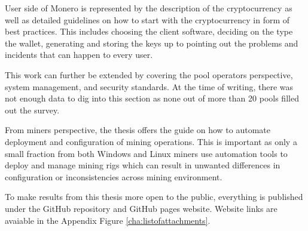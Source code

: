 \documentclass[
  printed, %
  table,   %
  lof,     %
  lot,     %
           oneside, color
]{fithesis3}
\begin{document}
User side of Monero is represented by the description of the cryptocurrency as well as detailed guidelines on how to start with the cryptocurrency in form of best practices. This includes choosing the client software, deciding on the type the wallet, generating and storing the keys up to pointing out the problems and incidents that can happen to every user.

This work can further be extended by covering the pool operators perspective,  system management, and security standards. At the time of writing, there was not enough data to dig into this section as none out of more than 20 pools filled out the survey.

From miners perspective, the thesis offers the guide on how to automate deployment and configuration of mining operations. This is important as only a small fraction from both Windows and Linux miners use automation tools to deploy and manage mining rigs which can result in unwanted differences in configuration or inconsistencies across mining environment.

To make results from this thesis more open to the public, everything is published under the GitHub repository and GitHub pages website. Website links are avaiable in the Appendix Figure \ref{cha:listofattachments}.

\fi

\setlength{\emergencystretch}{3em}
\printbibliography[heading=bibintoc]
\let\cleardoublepage\clearpage
\begingroup
\let\cleardoublepage\clearpage
\appendix
\end{document}
